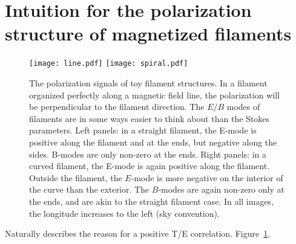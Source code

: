 \section{Intuition for the polarization structure of magnetized filaments}
\begin{figure}
  \texttt{[image: line.pdf]}
  \texttt{[image: spiral.pdf]}
  \caption{
    The polarization signals of toy filament structures.
    In a filament organized perfectly along a magnetic field line, the polarization will be perpendicular to the filament direction.  The $E/B$ modes of filaments are in some ways easier to think about than the Stokes parameters.
    Left panels: in a straight filament, the E-mode is positive along the filament and at the ends, but negative along the sides.  B-modes are only non-zero at the ends.  Right panels: in a curved filament, the E-mode is again positive along the filament.  Outside the filament, the $E$-mode is more negative on the interior of the curve than the exterior.  The $B$-modes are again non-zero only at the ends, and are akin to the straight filament case.
    In all images, the longitude increases to the left (sky convention).}
  \label{fig:polfilaments}
\end{figure}

Naturally describes the reason for a positive T/E correlation.  Figure~\ref{fig:polfilaments}.
